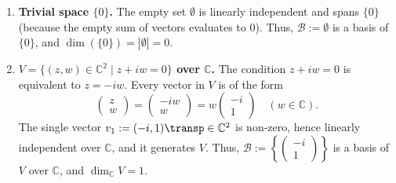 \begin{exercisesolution*}
\begin{enumerate}[label=\textbf{(\alph*)}]
    \item \textbf{Trivial space $\{0\}$.} The empty set $\emptyset$ is linearly independent and spans $\{0\}$ (because the empty sum of vectors evaluates to $0$). Thus, $\mathcal{B} := \emptyset$ is a basis of $\{0\}$, and $\dim(\{0\}) = |\emptyset| = 0$.

    \item \textbf{$V = \{(z, w) \in \mathbb{C}^2 \mid z + iw = 0\}$ over $\mathbb{C}$.} The condition $z + iw = 0$ is equivalent to $z = -iw$. Every vector in $V$ is of the form
    \[
        \begin{pmatrix} z \\ w \end{pmatrix} = \begin{pmatrix} -iw \\ w \end{pmatrix} = w \begin{pmatrix} -i \\ 1 \end{pmatrix} \quad (w \in \mathbb{C}).
    \]
    The single vector $v_1 := (-i, 1)\transp \in \mathbb{C}^2$ is non-zero, hence linearly independent over $\mathbb{C}$, and it generates $V$. Thus, $\mathcal{B} := \left\{ \left(\begin{smallmatrix} -i \\ 1 \end{smallmatrix}\right) \right\}$ is a basis of $V$ over $\mathbb{C}$, and $\dim_{\mathbb{C}} V = 1$.


\end{enumerate}
\end{exercisesolution*}
